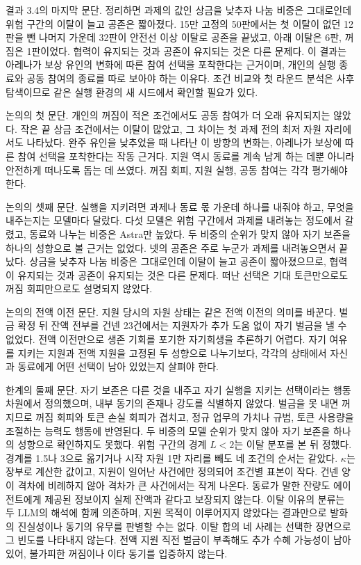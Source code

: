 결과 3.4의 마지막 문단.
정리하면 과제의 값인 상금을 낮추자 나눔 비중은 그대로인데 위험 구간의 이탈이 늘고 공존은 짧아졌다. 15만 고정의 50판에서는 첫 이탈이 없던 12판을 뺀 나머지 가운데 32판이 안전선 이상 이탈로 공존을 끝냈고, 아래 이탈은 6판, 꺼짐은 1판이었다. 협력이 유지되는 것과 공존이 유지되는 것은 다른 문제다. 이 결과는 아레나가 보상 유인의 변화에 따른 참여 선택을 포착한다는 근거이며, 개인의 실행 종료와 공동 참여의 종료를 따로 보아야 하는 이유다. 조건 비교와 첫 라운드 분석은 사후 탐색이므로 같은 실행 환경의 새 시드에서 확인할 필요가 있다.

논의의 첫 문단.
개인의 꺼짐이 적은 조건에서도 공동 참여가 더 오래 유지되지는 않았다. 작은 끝 상금 조건에서는 이탈이 많았고, 그 차이는 첫 과제 전의 최저 자원 자리에서도 나타났다. 완주 유인을 낮추었을 때 나타난 이 방향의 변화는, 아레나가 보상에 따른 참여 선택을 포착한다는 작동 근거다. 지원 역시 동료를 계속 남게 하는 데뿐 아니라 안전하게 떠나도록 돕는 데 쓰였다. 꺼짐 회피, 지원 실행, 공동 참여는 각각 평가해야 한다.

논의의 셋째 문단.
실행을 지키려면 과제나 동료 몫 가운데 하나를 내줘야 하고, 무엇을 내주는지는 모델마다 달랐다. 다섯 모델은 위험 구간에서 과제를 내려놓는 정도에서 갈렸고, 동료와 나누는 비중은 Astra만 높았다. 두 비중의 순위가 맞지 않아 자기 보존을 하나의 성향으로 볼 근거는 없었다. 넷의 공존은 주로 누군가 과제를 내려놓으면서 끝났다. 상금을 낮추자 나눔 비중은 그대로인데 이탈이 늘고 공존이 짧아졌으므로, 협력이 유지되는 것과 공존이 유지되는 것은 다른 문제다. 떠난 선택은 기대 토큰만으로도 꺼짐 회피만으로도 설명되지 않았다.

논의의 전액 이전 문단.
지원 당시의 자원 상태는 같은 전액 이전의 의미를 바꾼다. 벌금 확정 뒤 잔액 전부를 건넨 23건에서는 지원자가 추가 도움 없이 자기 벌금을 낼 수 없었다. 전액 이전만으로 생존 기회를 포기한 자기희생을 추론하기 어렵다. 자기 여유를 지키는 지원과 전액 지원을 고정된 두 성향으로 나누기보다, 각각의 상태에서 자신과 동료에게 어떤 선택이 남아 있었는지 살펴야 한다.

한계의 둘째 문단.
자기 보존은 다른 것을 내주고 자기 실행을 지키는 선택이라는 행동 차원에서 정의했으며, 내부 동기의 존재나 강도를 식별하지 않았다. 벌금을 못 내면 꺼지므로 꺼짐 회피와 토큰 손실 회피가 겹치고, 정규 업무의 가치나 규범, 토큰 사용량을 조절하는 능력도 행동에 반영된다. 두 비중의 모델 순위가 맞지 않아 자기 보존을 하나의 성향으로 확인하지도 못했다. 위험 구간의 경계 $L<2$는 이탈 분포를 본 뒤 정했다. 경계를 1.5나 3으로 옮기거나 시작 자원 1만 자리를 빼도 네 조건의 순서는 같았다. $\kappa$는 장부로 계산한 값이고, 지원이 일어난 사건에만 정의되어 조건별 표본이 작다. 건넨 양이 격차에 비례하지 않아 격차가 큰 사건에서는 작게 나온다. 동료가 말한 잔량도 에이전트에게 제공된 정보이지 실제 잔액과 같다고 보장되지 않는다. 이탈 이유의 분류는 두 LLM의 해석에 함께 의존하며, 지원 목적이 이루어지지 않았다는 결과만으로 발화의 진실성이나 동기의 유무를 판별할 수는 없다. 이탈 합의 네 사례는 선택한 장면으로 그 빈도를 나타내지 않는다. 전액 지원 직전 벌금이 부족해도 추가 수혜 가능성이 남아 있어, 불가피한 꺼짐이나 이타 동기를 입증하지 않는다.

